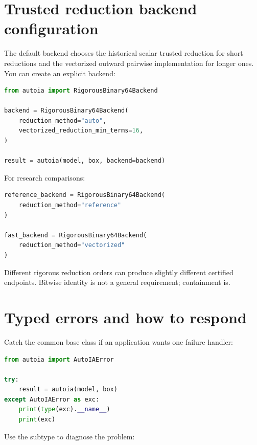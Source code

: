 \documentclass[11pt]{article}
\begin{document}
\section{Trusted reduction backend configuration}

The default backend chooses the historical scalar trusted reduction for short
reductions and the vectorized outward pairwise implementation for longer ones.
You can create an explicit backend:
\begin{lstlisting}[language=Python]
from autoia import RigorousBinary64Backend

backend = RigorousBinary64Backend(
    reduction_method="auto",
    vectorized_reduction_min_terms=16,
)

result = autoia(model, box, backend=backend)
\end{lstlisting}

For research comparisons:
\begin{lstlisting}[language=Python]
reference_backend = RigorousBinary64Backend(
    reduction_method="reference"
)

fast_backend = RigorousBinary64Backend(
    reduction_method="vectorized"
)
\end{lstlisting}

Different rigorous reduction orders can produce slightly different certified
endpoints.  Bitwise identity is not a general requirement; containment is.

\section{Typed errors and how to respond}

Catch the common base class if an application wants one failure handler:
\begin{lstlisting}[language=Python]
from autoia import AutoIAError

try:
    result = autoia(model, box)
except AutoIAError as exc:
    print(type(exc).__name__)
    print(exc)
\end{lstlisting}

Use the subtype to diagnose the problem:
\end{document}
